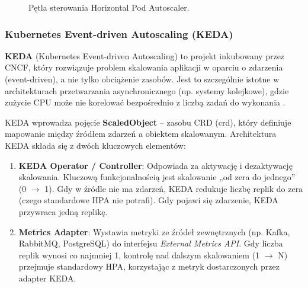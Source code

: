 \begin{figure}[h]
    \centering
    \caption{Pętla sterowania Horizontal Pod Autoscaler.}
    \label{fig:hpa-loop}
\end{figure}

\subsubsection{Kubernetes Event-driven Autoscaling (KEDA)}

\textbf{KEDA} (Kubernetes Event-driven Autoscaling) to projekt inkubowany przez CNCF, który rozwiązuje problem skalowania aplikacji w oparciu o zdarzenia (event-driven), a nie tylko obciążenie zasobów. Jest to szczególnie istotne w architekturach przetwarzania asynchronicznego (np. systemy kolejkowe), gdzie zużycie CPU może nie korelować bezpośrednio z liczbą zadań do wykonania \cite{keda_docs}.

KEDA wprowadza pojęcie \textbf{ScaledObject} – zasobu CRD (\gls{crd}), który definiuje mapowanie między źródłem zdarzeń a obiektem skalowanym. Architektura KEDA składa się z dwóch kluczowych elementów:
\begin{enumerate}
    \item \textbf{KEDA Operator / Controller}: Odpowiada za aktywację i dezaktywację skalowania. Kluczową funkcjonalnością jest skalowanie „od zera do jednego” (0 $\to$ 1). Gdy w źródle nie ma zdarzeń, KEDA redukuje liczbę replik do zera (czego standardowe HPA nie potrafi). Gdy pojawi się zdarzenie, KEDA przywraca jedną replikę.
    \item \textbf{Metrics Adapter}: Wystawia metryki ze źródeł zewnętrznych (np. Kafka, RabbitMQ, PostgreSQL) do interfejsu \textit{External Metrics API}. Gdy liczba replik wynosi co najmniej 1, kontrolę nad dalszym skalowaniem (1 $\to$ N) przejmuje standardowy HPA, korzystając z metryk dostarczonych przez adapter KEDA.
\end{enumerate}

